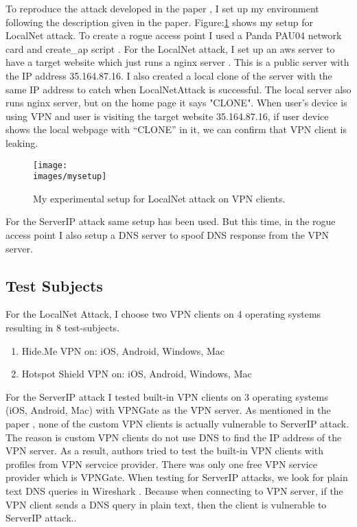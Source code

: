 \documentclass[letterpaper,11pt]{article}
\newcommand{\images}{images}
\newcommand{\fig}{Figure:}
\begin{document}
To reproduce the attack developed in the paper \cite{vpnleaks}, I set up my environment following the description given in the paper.
\fig \ref{fig:local-net-setup} shows my setup for LocalNet attack.
To create a rogue access point I used a Panda PAU04 network card \cite{panda} and create\_ap script \cite{createap}.
For the LocalNet attack, I set up an aws server to have a target website which just runs a nginx server \cite{nginx}.
This is a public server with the IP address 35.164.87.16.
I also created a local clone of the server with the same IP address to catch when LocalNetAttack is successful.
The local server also runs nginx server, but on the home page it says "CLONE". 
When user's device is using VPN and user is visiting the target website 35.164.87.16, if user device shows the local webpage with ``CLONE'' in it, we can confirm that VPN client is leaking.

\begin{figure}[h]
	\centering
	\texttt{[image: \\images/mysetup]}
	\caption{My experimental setup for LocalNet attack on VPN clients.}
	\label{fig:local-net-setup}
\end{figure}

For the ServerIP attack same setup has been used. But this time, in the rogue access point I also setup a DNS server to spoof DNS response from the VPN server.

\subsection{Test Subjects}
For the LocalNet Attack, I choose two VPN clients on 4 operating systems resulting in 8 test-subjects. 
\begin{enumerate}
	\item Hide.Me VPN \cite{hideme} on: iOS, Android, Windows, Mac
	\item Hotspot Shield VPN \cite{hotspotshield} on: iOS, Android, Windows, Mac
\end{enumerate}

For the ServerIP attack I tested built-in VPN clients on 3 operating systems (iOS, Android, Mac) with VPNGate \cite{vpngate} as the VPN server.
As mentioned in the paper \cite{vpnleaks}, none of the custom VPN clients is actually vulnerable to ServerIP attack.
The reason is custom VPN clients do not use DNS to find the IP address of the VPN server.
As a result, authors tried to test the built-in VPN clients with profiles from VPN servcice provider.
There was only one free VPN service provider which is VPNGate\cite{vpngate}.
When testing for ServerIP attacks, we look for plain text DNS queries in Wireshark \cite{wireshark}.
Because when connecting to VPN server, if the VPN client sends a DNS query in plain text,
then the client is vulnerable to ServerIP attack..
\end{document}
